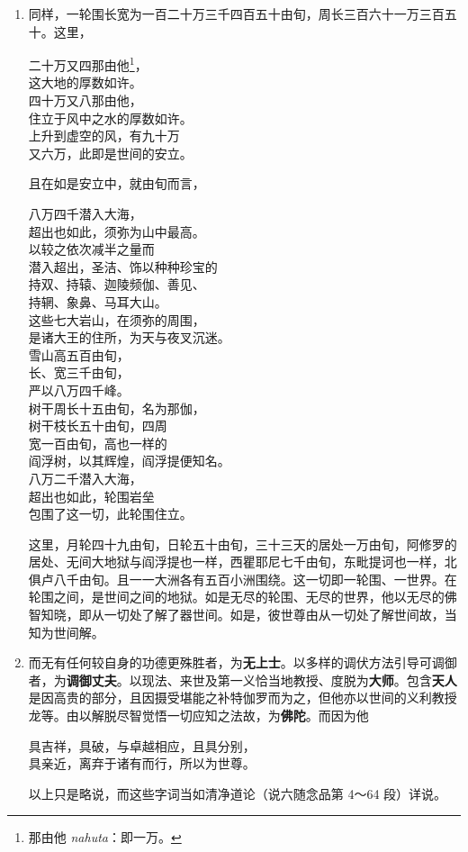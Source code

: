 \begin{enumerate}
\item 同样，一轮围长宽为一百二十万三千四百五十由旬，周长三百六十一万三百五十。这里，\begin{quoting}二十万又四那由他\footnote{那由他 \textit{nahuta}：即一万。}，\\这大地的厚数如许。\\四十万又八那由他，\\住立于风中之水的厚数如许。\\上升到虚空的风，有九十万\\又六万，此即是世间的安立。\end{quoting}且在如是安立中，就由旬而言，\begin{quoting}八万四千潜入大海，\\超出也如此，须弥为山中最高。\\以较之依次减半之量而\\潜入超出，圣洁、饰以种种珍宝的\\持双、持辕、迦陵频伽、善见、\\持辋、象鼻、马耳大山。\\这些七大岩山，在须弥的周围，\\是诸大王的住所，为天与夜叉沉迷。\\雪山高五百由旬，\\长、宽三千由旬，\\严以八万四千峰。\\树干周长十五由旬，名为那伽，\\树干枝长五十由旬，四周\\宽一百由旬，高也一样的\\阎浮树，以其辉煌，阎浮提便知名。\\八万二千潜入大海，\\超出也如此，轮围岩垒\\包围了这一切，此轮围住立。\end{quoting}这里，月轮四十九由旬，日轮五十由旬，三十三天的居处一万由旬，阿修罗的居处、无间大地狱与阎浮提也一样，西瞿耶尼七千由旬，东毗提诃也一样，北俱卢八千由旬。且一一大洲各有五百小洲围绕。这一切即一轮围、一世界。在轮围之间，是世间之间的地狱。如是无尽的轮围、无尽的世界，他以无尽的佛智知晓，即从一切处了解了器世间。如是，彼世尊由从一切处了解世间故，当知为世间解。
\item 而无有任何较自身的功德更殊胜者，为\textbf{无上士}。以多样的调伏方法引导可调御者，为\textbf{调御丈夫}。以现法、来世及第一义恰当地教授、度脱为\textbf{大师}。包含\textbf{天人}是因高贵的部分，且因摄受堪能之补特伽罗而为之，但他亦以世间的义利教授龙等。由以解脱尽智觉悟一切应知之法故，为\textbf{佛陀}。而因为他\begin{quoting}具吉祥，具破，与卓越相应，且具分别，\\具亲近，离弃于诸有而行，所以为世尊。\end{quoting}以上只是略说，而这些字词当如清净道论（说六随念品第 4～64 段）详说。

\end{enumerate}
